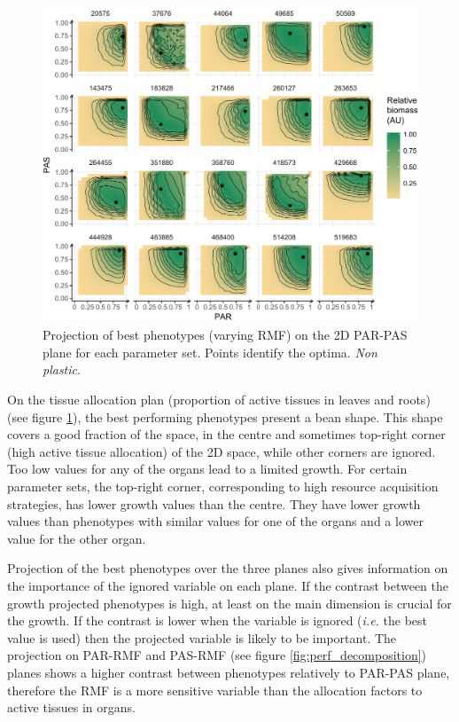 \begin{figure}
\includegraphics[width = \textwidth]{./2_PP/Figures/Landscape/landscape_PAR-PAS.pdf}
\caption{Projection of best phenotypes (varying RMF) on the 2D PAR-PAS plane for each parameter set. Points identify the optima. \textit{Non plastic}.}\label{fig:best_phenotypes}
\end{figure}

 On the tissue allocation plan (proportion of active tissues in leaves and roots) (see figure \ref{fig:best_phenotypes}), the best performing phenotypes present a bean shape. This shape covers a good fraction of the space, in the centre and sometimes top-right corner (high active tissue allocation) of the 2D space, while other corners are ignored. Too low values for any of the organs lead to a limited growth. For certain parameter sets, the top-right corner, corresponding to high resource acquisition strategies, has lower growth values than the centre. They have lower growth values than phenotypes with similar values for one of the organs and a lower value for the other organ.  %
 

Projection of the best phenotypes over the three planes also gives information on the importance of the ignored variable on each plane. If the contrast between the growth projected phenotypes is high, at least on the main dimension is crucial for the growth. If the contrast is lower when the variable is ignored (\textit{i.e.} the best value is used) then the projected variable is likely to be important. The projection on PAR-RMF and PAS-RMF (see figure \ref{fig:perf_decomposition}) planes shows a higher contrast between phenotypes relatively to PAR-PAS plane, therefore the RMF is a more sensitive variable than the allocation factors to active tissues in organs.


